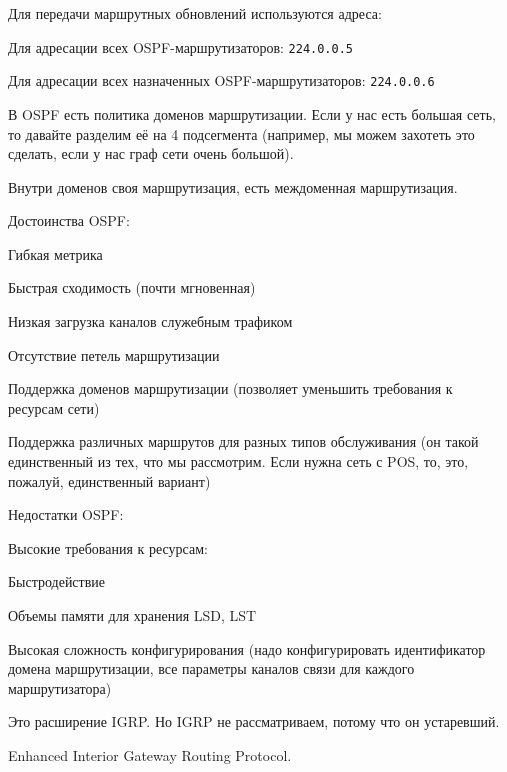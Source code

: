 Для передачи маршрутных обновлений используются адреса:
\begin{MyItemize}
    \item Для адресации всех OSPF-маршрутизаторов: {\tt 224.0.0.5}
    \item Для адресации всех назначенных OSPF-маршрутизаторов: {\tt 224.0.0.6}
\end{MyItemize}

В OSPF есть политика доменов маршрутизации. Если у нас есть большая сеть, то давайте разделим её на 4 подсегмента (например, мы можем захотеть это сделать, если у нас граф сети очень большой).

Внутри доменов своя маршрутизация, есть междоменная маршрутизация. 

Достоинства OSPF:
\begin{MyItemize}
    \item Гибкая метрика
    \item Быстрая сходимость (почти мгновенная)
    \item Низкая загрузка каналов служебным трафиком
    \item Отсутствие петель маршрутизации
    \item Поддержка доменов маршрутизации (позволяет уменьшить требования к ресурсам сети)
    \item Поддержка различных маршрутов для разных типов обслуживания (он такой единственный из тех, что мы рассмотрим. Если нужна сеть с POS, то, это, пожалуй, единственный вариант)
\end{MyItemize}
Недостатки OSPF:
\begin{MyItemize}
    \item Высокие требования к ресурсам:
    \begin{MyItemize}
        \item Быстродействие
        \item Объемы памяти для хранения LSD, LST
    \end{MyItemize}
    \item Высокая сложность конфигурирования (надо конфигурировать идентификатор домена маршрутизации, все параметры каналов связи для каждого маршрутизатора)
\end{MyItemize}


Это расширение IGRP. Но IGRP не рассматриваем, потому что он устаревший.

Enhanced Interior Gateway Routing Protocol.


